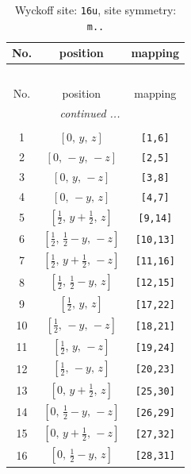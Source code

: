 \documentclass[fleqn,8pt]{jsarticle}
\begin{document}
\begin{longtable}{ccc}
\caption{Wyckoff site: {\tt 16u}, site symmetry: {\tt m..}}
 \\
 \hline \hline
No. & position & mapping \\ \hline \endfirsthead

\multicolumn{2}{l}{\tablename\ \thetable{}} \\
 \hline \hline
No. & position & mapping \\ \hline \endhead

 \hline \hline
\multicolumn{2}{r}{\footnotesize\it continued ...} \\ \endfoot

 \hline \hline
\multicolumn{2}{r}{} \\ \endlastfoot

1 & $\left[ 0,\, y,\, z \right]$ & {\tt [1,6]} \\ \hline
2 & $\left[ 0,\, - y,\, - z \right]$ & {\tt [2,5]} \\ \hline
3 & $\left[ 0,\, y,\, - z \right]$ & {\tt [3,8]} \\ \hline
4 & $\left[ 0,\, - y,\, z \right]$ & {\tt [4,7]} \\ \hline
5 & $\left[ \frac{1}{2},\, y + \frac{1}{2},\, z \right]$ & {\tt [9,14]} \\ \hline
6 & $\left[ \frac{1}{2},\, \frac{1}{2} - y,\, - z \right]$ & {\tt [10,13]} \\ \hline
7 & $\left[ \frac{1}{2},\, y + \frac{1}{2},\, - z \right]$ & {\tt [11,16]} \\ \hline
8 & $\left[ \frac{1}{2},\, \frac{1}{2} - y,\, z \right]$ & {\tt [12,15]} \\ \hline
9 & $\left[ \frac{1}{2},\, y,\, z \right]$ & {\tt [17,22]} \\ \hline
10 & $\left[ \frac{1}{2},\, - y,\, - z \right]$ & {\tt [18,21]} \\ \hline
11 & $\left[ \frac{1}{2},\, y,\, - z \right]$ & {\tt [19,24]} \\ \hline
12 & $\left[ \frac{1}{2},\, - y,\, z \right]$ & {\tt [20,23]} \\ \hline
13 & $\left[ 0,\, y + \frac{1}{2},\, z \right]$ & {\tt [25,30]} \\ \hline
14 & $\left[ 0,\, \frac{1}{2} - y,\, - z \right]$ & {\tt [26,29]} \\ \hline
15 & $\left[ 0,\, y + \frac{1}{2},\, - z \right]$ & {\tt [27,32]} \\ \hline
16 & $\left[ 0,\, \frac{1}{2} - y,\, z \right]$ & {\tt [28,31]} \\
\end{longtable}
\end{document}
